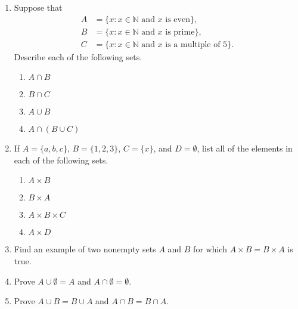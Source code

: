 {\small
\begin{enumerate}


\item
Suppose that
\begin{align*}
A & = \{ x : x \in \mathbb N \text{ and } x \text{ is even} \}, \\
B & = \{x : x \in \mathbb N \text{ and } x \text{ is prime}\}, \\
C & = \{ x : x \in \mathbb N \text{ and } x \text{ is a multiple of 5}\}.
\end{align*}
Describe each of the following sets. 
\begin{multicols}{2}
\begin{enumerate}

\item
$A \cap B$

\item
$B \cap C$

\item
$A \cup B$

\item
$A \cap (B \cup C)$

\end{enumerate}
\end{multicols}
 
\item
If $A = \{ a, b, c \}$, $B = \{ 1, 2, 3 \}$, $C = \{ x \}$, and $D = \emptyset$, list all of the elements in each of the following sets. 
\begin{multicols}{2}
\begin{enumerate}

\item
$A \times B$

\item
$B \times A$

\item
$A \times B \times C$

\item
$A \times D$

\end{enumerate}
\end{multicols}
  
\item
Find an example of two nonempty sets $A$ and $B$ for which $A \times B = B \times A$ is true. 
 
\item
Prove $A \cup \emptyset = A$ and $A \cap \emptyset = \emptyset$.
 
\item
Prove $A \cup B = B \cup A$ and $A \cap B = B \cap A$.
 

\end{enumerate}}
